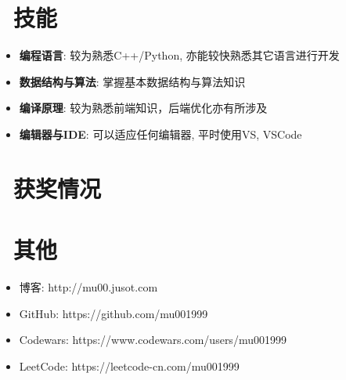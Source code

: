 \documentclass{resume}
\begin{document}

\section{\faCogs\ 技能}
\begin{itemize}[parsep=0.5ex]
  \item \textbf{编程语言}: 较为熟悉C++/Python, 亦能较快熟悉其它语言进行开发
  \item \textbf{数据结构与算法}: 掌握基本数据结构与算法知识
  \item \textbf{编译原理}: 较为熟悉前端知识，后端优化亦有所涉及
  \item \textbf{编辑器与IDE}: 可以适应任何编辑器, 平时使用VS, VSCode
\end{itemize}

\section{\faHeartO\ 获奖情况}

\section{\faInfo\ 其他}
\begin{itemize}[parsep=0.5ex]
  \item 博客: http://mu00.jusot.com
  \item GitHub: https://github.com/mu001999
  \item Codewars: https://www.codewars.com/users/mu001999
  \item LeetCode: https://leetcode-cn.com/mu001999
\end{itemize}

%
%
\end{document}
